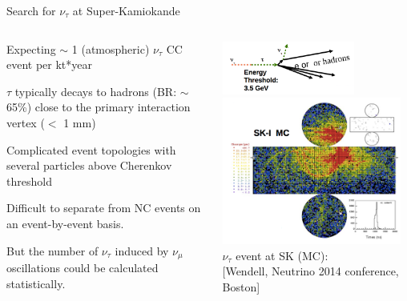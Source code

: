 \begin{frame}[t]{Search for $\nu_{\tau}$ at Super-Kamiokande}

\begin{columns}
  \begin{column}{0.50\textwidth}
    \begin{itemize}
    {\small
     \item Expecting $\sim$ 1 (atmospheric) $\nu_{\tau}$ CC event per kt*year
     \item $\tau$ typically decays to hadrons (BR: $\sim$65\%) close to the primary interaction vertex ($<$ 1 mm)
     \item Complicated event topologies with several particles above Cherenkov threshold
     \item Difficult to separate from NC events on an event-by-event basis.
     \item But the number of $\nu_{\tau}$ induced by $\nu_{\mu}$ oscillations could be calculated statistically.
    }
    \end{itemize}
  \end{column}
  \begin{column}{0.50\textwidth}
    \centering
    \includegraphics[width=0.70\textwidth]{./images/3nu/atmo/nu_tau_reaction.png}\\
    \includegraphics[width=0.95\textwidth]{./images/3nu/atmo/sk_tau_display.png}\\
    $\nu_{\tau}$ event at SK (MC):\\
    {\scriptsize \color{blue}[Wendell, Neutrino 2014 conference, Boston]}
  \end{column}
\end{columns}
\end{frame}


